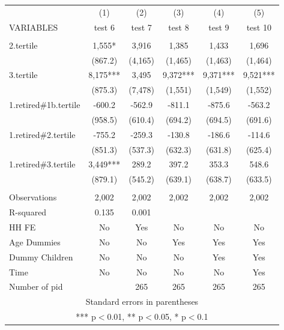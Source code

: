 \begin{tabular}{lccccc} \hline
 & (1) & (2) & (3) & (4) & (5) \\
VARIABLES & test 6 & test 7 & test 8 & test 9 & test 10 \\ \hline
 &  &  &  &  &  \\
2.tertile & 1,555* & 3,916 & 1,385 & 1,433 & 1,696 \\
 & (867.2) & (4,165) & (1,465) & (1,463) & (1,464) \\
3.tertile & 8,175*** & 3,495 & 9,372*** & 9,371*** & 9,521*** \\
 & (875.3) & (7,478) & (1,551) & (1,549) & (1,552) \\
1.retired\#1b.tertile & -600.2 & -562.9 & -811.1 & -875.6 & -563.2 \\
 & (958.5) & (610.4) & (694.2) & (694.5) & (691.6) \\
1.retired\#2.tertile & -755.2 & -259.3 & -130.8 & -186.6 & -114.6 \\
 & (851.3) & (537.3) & (632.3) & (631.8) & (625.4) \\
1.retired\#3.tertile & 3,449*** & 289.2 & 397.2 & 353.3 & 548.6 \\
 & (879.1) & (545.2) & (639.1) & (638.7) & (633.5) \\
 &  &  &  &  &  \\
Observations & 2,002 & 2,002 & 2,002 & 2,002 & 2,002 \\
R-squared & 0.135 & 0.001 &  &  &  \\
HH FE & No & Yes & No & No & No \\
Age Dummies & No & No & Yes & Yes & Yes \\
Dummy Children & No & No & No & Yes & Yes \\
Time & No & No & No & No & Yes \\
 Number of pid &  & 265 & 265 & 265 & 265 \\ \hline
\multicolumn{6}{c}{ Standard errors in parentheses} \\
\multicolumn{6}{c}{ *** p$<$0.01, ** p$<$0.05, * p$<$0.1} \\
\end{tabular}
